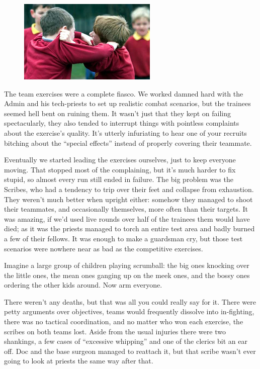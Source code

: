 \begin{figure}
	\begin{center}
		\includegraphics[width=\figwidth]{pics/8/16.png}
	\end{center}
\end{figure}
The team exercises were a complete fiasco. 
We worked damned hard with the Admin and his tech-priests to set up realistic combat scenarios, but the trainees seemed hell bent on ruining them. 
It wasn’t just that they kept on failing spectacularly, they also tended to interrupt things with pointless complaints about the exercise’s quality. 
It’s utterly infuriating to hear one of your recruits bitching about the “special effects” instead of properly covering their teammate.

Eventually we started leading the exercises ourselves, just to keep everyone moving. 
That stopped most of the complaining, but it’s much harder to fix stupid, so almost every run still ended in failure. 
The big problem was the Scribes, who had a tendency to trip over their feet and collapse from exhaustion. 
They weren’t much better when upright either: 
somehow they managed to shoot their teammates, and occasionally themselves, more often than their targets. 
It was amazing, if we’d used live rounds over half of the trainees them would have died; 
as it was the priests managed to torch an entire test area and badly burned a few of their fellows. 
It was enough to make a guardsman cry, but those test scenarios were nowhere near as bad as the competitive exercises.

Imagine a large group of children playing scrumball: 
the big ones knocking over the little ones, the mean ones ganging up on the meek ones, and the bossy ones ordering the other kids around. 
Now arm everyone.

There weren’t any deaths, but that was all you could really say for it. 
There were petty arguments over objectives, teams would frequently dissolve into in-fighting, there was no tactical coordination, and no matter who won each exercise, the scribes on both teams lost. 
Aside from the usual injuries there were two shankings, a few cases of “excessive whipping” and one of the clerics bit an ear off. 
Doc and the base surgeon managed to reattach it, but that scribe wasn’t ever going to look at priests the same way after that.

